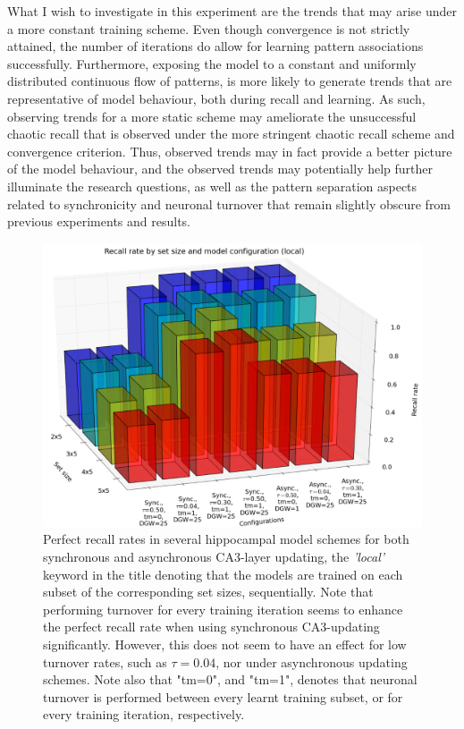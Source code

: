 What I wish to investigate in this experiment are the trends that may arise under a more constant training scheme. Even though convergence is not strictly attained, the number of iterations do allow for learning pattern associations successfully. Furthermore, exposing the model to a constant and uniformly distributed continuous flow of patterns, is more likely to generate trends that are representative of model behaviour, both during recall and learning. As such, observing trends for a more static scheme may ameliorate the unsuccessful chaotic recall that is observed under the more stringent chaotic recall scheme and convergence criterion. Thus, observed trends may in fact provide a better picture of the model behaviour, and the observed trends may potentially help further illuminate the research questions, as well as the pattern separation aspects related to synchronicity and neuronal turnover that remain slightly obscure from previous experiments and results.


\begin{figure}
    \centering
    \includegraphics[width=14cm]{fig/i-iters/local-recall}
    \caption{Perfect recall rates in several hippocampal model schemes for both synchronous and asynchronous CA3-layer updating, the \textit{'local'} keyword in the title denoting that the models are trained on each subset of the corresponding set sizes, sequentially. Note that performing turnover for every training iteration seems to enhance the perfect recall rate when using synchronous CA3-updating significantly. However, this does not seem to have an effect for low turnover rates, such as $\tau=0.04$, nor under asynchronous updating schemes. Note also that "tm=0", and "tm=1", denotes that neuronal turnover is performed between every learnt training subset, or for every training iteration, respectively.}
    \label{fig:local-recall}
\end{figure}


